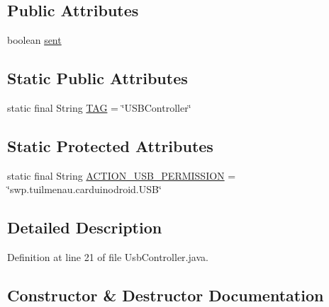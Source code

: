 \subsection*{Public Attributes}
\begin{DoxyCompactItemize}
\item 
boolean \hyperlink{classswp_1_1tuilmenau_1_1carduinodroid_1_1controller_1_1_usb_controller_a3dec7c34ddb753bf6bb81aa1d84f3c5d}{sent}
\end{DoxyCompactItemize}
\subsection*{Static Public Attributes}
\begin{DoxyCompactItemize}
\item 
static final String \hyperlink{classswp_1_1tuilmenau_1_1carduinodroid_1_1controller_1_1_usb_controller_ac6cbc77f36172b703ce0ea61a5d6f976}{T\+A\+G} = \char`\"{}U\+S\+B\+Controller\char`\"{}
\end{DoxyCompactItemize}
\subsection*{Static Protected Attributes}
\begin{DoxyCompactItemize}
\item 
static final String \hyperlink{classswp_1_1tuilmenau_1_1carduinodroid_1_1controller_1_1_usb_controller_a6b5f3ff9713306bec517ee3364dfd06a}{A\+C\+T\+I\+O\+N\+\_\+\+U\+S\+B\+\_\+\+P\+E\+R\+M\+I\+S\+S\+I\+O\+N} = \char`\"{}swp.\+tuilmenau.\+carduinodroid.\+U\+S\+B\char`\"{}
\end{DoxyCompactItemize}


\subsection{Detailed Description}


Definition at line 21 of file Usb\+Controller.\+java.



\subsection{Constructor \& Destructor Documentation}
\hypertarget{classswp_1_1tuilmenau_1_1carduinodroid_1_1controller_1_1_usb_controller_a49aa06782978ab1150cd4b12598723a4}{}

